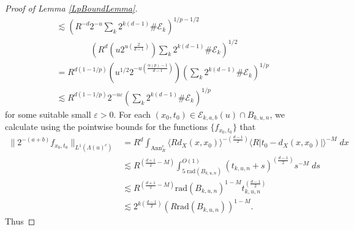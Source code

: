 \begin{proof}[Proof of Lemma \ref{LpBoundLemma}]
\begin{equation}
\begin{split}
    &\lesssim \left( R^{-d} 2^{-u} \sum\nolimits_k 2^{k(d-1)} \# \mathcal{E}_k \right)^{1/p - 1/2}\\
    &\quad\quad\quad\quad \left( R^{d} \left( u 2^{u \left( \frac{2}{d-1} \right)} \right) \sum\nolimits_k 2^{k(d-1)} \# \mathcal{E}_k \right)^{1/2}\\
    &= R^{d(1-1/p)} \left( u^{1/2} 2^{-u \left( \frac{\alpha(p) - 1}{d - 1} \right)}  \right) \left( \sum\nolimits_k 2^{k(d-1)} \# \mathcal{E}_k \right)^{1/p}\\
    &\lesssim R^{d(1 - 1/p)} 2^{-u \varepsilon} \left( \sum\nolimits_k 2^{k(d-1)} \# \mathcal{E}_k \right)^{1/p}
\end{split}
\end{equation}
%
for some suitable small $\varepsilon > 0$. For each $(x_0,t_0) \in \mathcal{E}_{k,a,b}(u) \cap B_{k,u,n}$, we calculate using the pointwise bounds for the functions $\{ f_{x_0,t_0} \}$ that
%
\begin{equation}
\begin{split}
        \| 2^{-(a+b)} f_{x_0,t_0} \|_{L^1(\Lambda(u)^c)} &= R^{d} \int_{\text{Ann}_R^c} \langle R d_X(x,x_0) \rangle^{- \left( \frac{d-1}{2} \right)} \langle R |t_0 - d_X(x,x_0)| \rangle^{-M}\; dx\\
        &\lesssim R^{ \left( \frac{d+1}{2} - M \right)} \int_{5\; \text{rad}(B_{k,u,n})}^{O(1)} ( t_{k,u,n} + s)^{\left( \frac{d-1}{2} \right)} s^{-M}\; ds\\
        &\lesssim R^{ \left( \frac{d+1}{2} - M \right)} \text{rad}(B_{k,u,n})^{1-M} t_{k,u,n}^{\left( \frac{d-1}{2} \right)}\\
        &\lesssim 2^{k \left( \frac{d-1}{2} \right)} (R \text{rad}(B_{k,u,n}))^{1 - M}.
\end{split}
\end{equation}
%
Thus
%

\end{proof}

